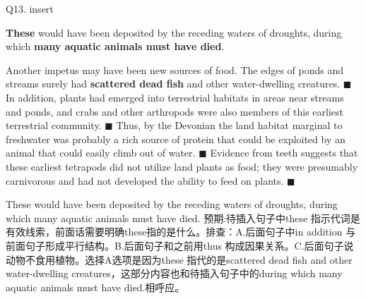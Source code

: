 \begin{blk}
    \begin{qst}
        Q13. insert

        \textbf{These} would have been deposited by the receding waters of droughts, during which \textbf{many aquatic animals must have died}.
    \end{qst}

    \begin{psgq}
        Another impetus may have been new sources of food. The edges of ponds and streams surely had \textbf{scattered dead fish} and other water-dwelling creatures. $\blacksquare$ In addition, plants had emerged into terrestrial habitats in areas near streams and ponds, and crabs and other arthropods were also members of this earliest terrestrial community. $\blacksquare$ Thus, by the Devonian the land habitat marginal to freshwater was probably a rich source of protein that could be exploited by an animal that could easily climb out of water. $\blacksquare$ Evidence from teeth suggests that these earliest tetrapods did not utilize land plants as food; they were presumably carnivorous and had not developed the ability to feed on plants. $\blacksquare$
    \end{psgq}

    \begin{nlz}
        These would have been deposited by the receding waters of droughts, during which many aquatic animals must have died. 预期:待插入句子中these 指示代词是有效线索，前面话需要明确these指的是什么。排查：A.后面句子中in addition 与前面句子形成平行结构。B.后面句子和之前用thus 构成因果关系。C.后面句子说动物不食用植物。选择A选项是因为these 指代的是scattered dead fish and other water-dwelling creatures，这部分内容也和待插入句子中的during which many aquatic animals must have died.相呼应。
    \end{nlz}
\end{blk}
